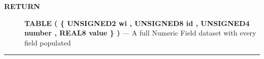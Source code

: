\par
\begin{description}
\item [\colorbox{tagtype}{\color{white} \textbf{\textsf{RETURN}}}] \textbf{TABLE ( \{ UNSIGNED2 wi , UNSIGNED8 id , UNSIGNED4 number , REAL8 value \} )} --- A full Numeric Field dataset with every field populated
\end{description}




\rule{\linewidth}{0.5pt}
